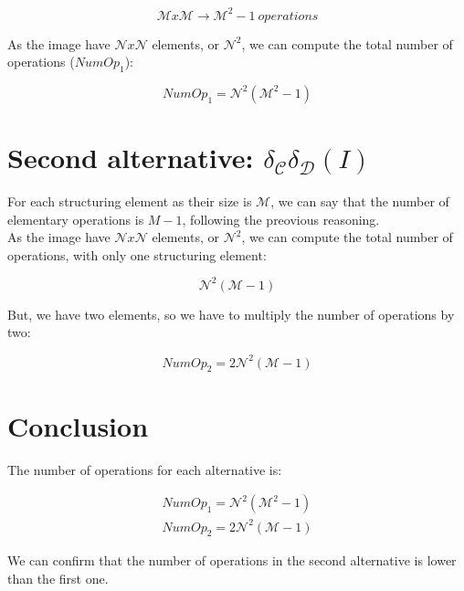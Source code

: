\documentclass{article}
\begin{document}
\begin{equation}
    \mathcal{M}x\mathcal{M} \rightarrow \mathcal{M}^2-1\:operations
\end{equation}

As the image have $\mathcal{N}x\mathcal{N}$ elements, or $\mathcal{N}^2$, we can compute the total number of operations ($NumOp_1$):

\begin{equation}
    NumOp_1 = \mathcal{N}^2 (\mathcal{M}^2 - 1)
\end{equation}

\section{Second alternative: $\delta_{\mathcal{C}}\delta_{\mathcal{D}}(I)$}

For each structuring element as their size is $\mathcal{M}$, we can say that the number of elementary operations is $M-1$, following the preovious reasoning.\\

As the image have $\mathcal{N}x\mathcal{N}$ elements, or $\mathcal{N}^2$, we can compute the total number of operations, with only one structuring element:

\begin{equation}
    \mathcal{N}^2 (\mathcal{M} - 1)
\end{equation}

But, we have two elements, so we have to multiply the number of operations by two:

\begin{equation}
    NumOp_2 = 2\mathcal{N}^2 (\mathcal{M} - 1)
\end{equation}

\section{Conclusion}

The number of operations for each alternative is:

\begin{equation}
\begin{split}
    NumOp_1 = \mathcal{N}^2(\mathcal{M}^2 - 1) \\
    NumOp_2 = 2\mathcal{N}^2(\mathcal{M} - 1)
\end{split}
\end{equation}

We can confirm that the number of operations in the second alternative is lower than the first one.
\end{document}

